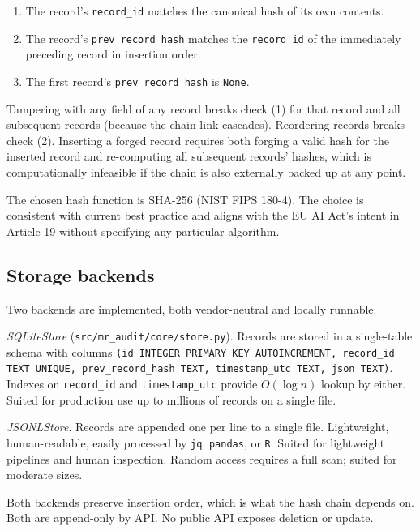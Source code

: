 \begin{enumerate}[leftmargin=*]
    \item The record's \texttt{record\_id} matches the canonical hash of its own contents.
    \item The record's \texttt{prev\_record\_hash} matches the \texttt{record\_id} of the immediately preceding record in insertion order.
    \item The first record's \texttt{prev\_record\_hash} is \texttt{None}.
\end{enumerate}

Tampering with any field of any record breaks check (1) for that record and all subsequent records (because the chain link cascades). Reordering records breaks check (2). Inserting a forged record requires both forging a valid hash for the inserted record and re-computing all subsequent records' hashes, which is computationally infeasible if the chain is also externally backed up at any point.

The chosen hash function is SHA-256 (NIST FIPS 180-4). The choice is consistent with current best practice and aligns with the EU AI Act's intent in Article 19 without specifying any particular algorithm.

\subsection{Storage backends}\label{sec:storage}

Two backends are implemented, both vendor-neutral and locally runnable.

\textit{SQLiteStore} (\texttt{src/mr\_audit/core/store.py}). Records are stored in a single-table schema with columns \texttt{(id INTEGER PRIMARY KEY AUTOINCREMENT, record\_id TEXT UNIQUE, prev\_record\_hash TEXT, timestamp\_utc TEXT, json TEXT)}. Indexes on \texttt{record\_id} and \texttt{timestamp\_utc} provide $O(\log n)$ lookup by either. Suited for production use up to millions of records on a single file.

\textit{JSONLStore}. Records are appended one per line to a single file. Lightweight, human-readable, easily processed by \texttt{jq}, \texttt{pandas}, or \texttt{R}. Suited for lightweight pipelines and human inspection. Random access requires a full scan; suited for moderate sizes.

Both backends preserve insertion order, which is what the hash chain depends on. Both are append-only by API. No public API exposes deletion or update.

